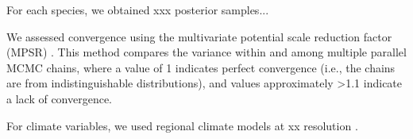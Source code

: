 \documentclass[11pt]{article}
\begin{document}
For each species, we obtained xxx posterior samples...

We assessed convergence using the multivariate potential scale reduction factor (MPSR) \cite{Brooks1998}.
This method compares the variance within and among multiple parallel MCMC chains, where a value of 1 indicates perfect convergence (i.e., the chains are from indistinguishable distributions), and values approximately \textgreater1.1 indicate a lack of convergence.

For climate variables, we used regional climate models at xx resolution \cite{McKenney2011}.

\renewcommand\refname{Literature Cited}
{}

\end{document}
